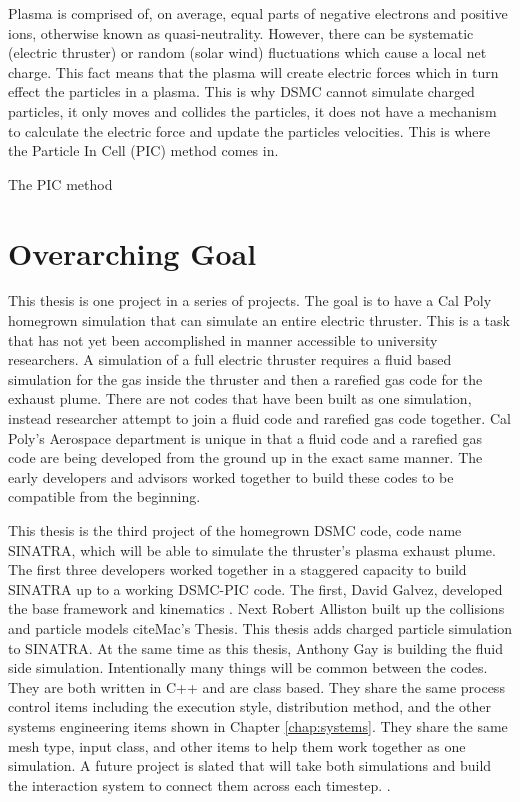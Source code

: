 \indent Plasma is comprised of, on average, equal parts of negative electrons and positive ions, otherwise known as quasi-neutrality. However, there can be systematic (electric thruster) or random (solar wind) fluctuations which cause a local net charge. This fact means that the plasma will create electric forces which in turn effect the particles in a plasma. This is why DSMC cannot simulate charged particles, it only moves and collides the particles, it does not have a mechanism to calculate the electric force and update the particles velocities. This is where the Particle In Cell (PIC) method comes in. \par

\indent The PIC method 


\section{Overarching Goal}
This thesis is one project in a series of projects. The goal is to have a Cal Poly homegrown simulation that can simulate an entire electric thruster. This is a task that has not yet been accomplished in manner accessible to university researchers. A simulation of a full electric thruster requires a fluid based simulation for the gas inside the thruster and then a rarefied gas code for the exhaust plume. There are not codes that have been built as one simulation, instead researcher attempt to join a fluid code and rarefied gas code together. Cal Poly’s Aerospace department is unique in that a fluid code and a rarefied gas code are being developed from the ground up in the exact same manner. The early developers and advisors worked together to build these codes to be compatible from the beginning. \par

\indent This thesis is the third project of the homegrown DSMC code, code name SINATRA, which will be able to simulate the thruster’s plasma exhaust plume. The first three developers worked together in a staggered capacity to build SINATRA up to a working DSMC-PIC code. The first, David Galvez, developed the base framework and kinematics \cite{Galvez2018a}. Next Robert Alliston built up the collisions and particle models cite{Mac’s Thesis}. This thesis adds charged particle simulation to SINATRA. At the same time as this thesis, Anthony Gay is building the fluid side simulation. Intentionally many things will be common between the codes. They are both written in C++ and are class based. They share the same process control items including the execution style, distribution method, and the other systems engineering items shown in Chapter \ref{chap:systems}. They share the same mesh type, input class, and other items to help them work together as one simulation. A future project is slated that will take both simulations and build the interaction system to connect them across each timestep.
. 



